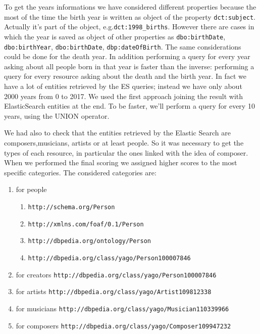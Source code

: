\documentclass[paper=a4, fontsize=11pt]{scrartcl}
\begin{document}
To get the years informations we have considered different properties because the most of the time the birth year is written as object of the property \verb|dct:subject|. Actually it's part of the object, e.g.\verb|dct:1998_births|. However there are cases in which the year is saved as object of other properties as \verb|dbo:birthDate|, \verb|dbo:birthYear|,
\verb|dbo:birthDate|, \verb|dbp:dateOfBirth|.
The same considerations could be done for the death year. 
In addition performing a query for every year asking about all people born in that year is faster than the inverse: performing a query for every resource asking about the death and the birth year. In fact we have a lot of entities retrieved by the ES queries; instead we have only about 2000 years from 0 to 2017. We used the first approach joining the result with ElasticSearch entities at the end. 
To be faster, we'll perform a query for every 10 years, using the UNION operator. 

We had also to check that the entities retrieved by the Elastic Search are composers,musicians, artists or at least people. So it was necessary to get the types of each resource, in particular the ones linked with the idea of composer. When we performed the final scoring we assigned higher scores to the most specific categories. 
The considered categories are:

\begin{enumerate}

\item for people \begin{enumerate} \item \verb|http://schema.org/Person| \item \verb|http://xmlns.com/foaf/0.1/Person|\item \verb|http://dbpedia.org/ontology/Person|\item \verb|http://dbpedia.org/class/yago/Person100007846| \end{enumerate}

\item for creators  \verb|http://dbpedia.org/class/yago/Person100007846| 

\item for artists \verb|http://dbpedia.org/class/yago/Artist109812338| 

\item for musicians \verb|http://dbpedia.org/class/yago/Musician110339966| 

\item for composers \verb|http://dbpedia.org/class/yago/Composer109947232| 
\end{enumerate}
\end{document}

